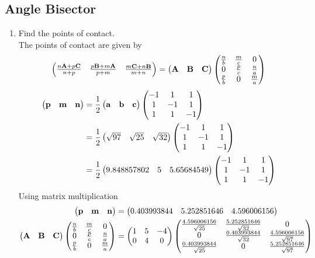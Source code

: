 \documentclass[11pt]{book}
\begin{document}
\subsection{Angle Bisector}


\begin{enumerate}[label=\thesubsection.\arabic*.,ref=\thesubsection.\theenumi]
\item Find the points of contact. \\ 
\solution The points of contact are given by 
\begin{align}
\begin{pmatrix}			\frac{n\mathbf{A}+p\mathbf{C}}{n+p}
&
\frac{p\mathbf{B}+m\mathbf{A}}{p+m}
&
\frac{m\mathbf{C}+n\mathbf{B}}{m+n}
\end{pmatrix}
= 	\begin{pmatrix}\mathbf{A} & \mathbf{B} &\mathbf{C}\end{pmatrix}\begin{pmatrix}\frac{n}{b} & \frac{m}{c} & 0\\0 & \frac{p}{c} & \frac{n}{a} \\\frac{p}{b} & 0 & \frac{m}{a}\end{pmatrix}
\end{align}
\begin{align}
    \begin{pmatrix}\mathbf{p} & \mathbf{m} & \mathbf{n} \end{pmatrix} &=\frac{1}{2} \begin{pmatrix}\mathbf{a} & \mathbf{b} & \mathbf{c}\end{pmatrix} \begin{pmatrix} -1 & 1 & 1 \\1 & -1 & 1 \\1 & 1 & -1 \end{pmatrix} \\
   &= \frac{1}{2}\begin{pmatrix} \sqrt{97}&  \sqrt{25} & \sqrt{32} \end{pmatrix}\begin{pmatrix} -1 & 1 & 1 \\1 & -1 & 1 \\1 & 1 & -1 \end{pmatrix}  \\
   &= \frac{1}{2}\begin{pmatrix} 9.848857802&  5 & 5.65684549 \end{pmatrix}\begin{pmatrix} -1 & 1 & 1 \\1 & -1 & 1 \\1 & 1 & -1 \end{pmatrix}
\end{align}
Using matrix multiplication 
\begin{align}
        \begin{pmatrix}\mathbf{p} & \mathbf{m} & \mathbf{n} \end{pmatrix} &= \begin{pmatrix}  0.403993844& 5.252851646 & 4.596006156 \end{pmatrix}   \\
\begin{pmatrix}\mathbf{A} & \mathbf{B} &\mathbf{C}\end{pmatrix}\begin{pmatrix}\frac{n}{b} & \frac{m}{c} & 0\\0 & \frac{p}{c} & \frac{n}{a} \\\frac{p}{b} & 0 & \frac{m}{a}\end{pmatrix} 
  &= \begin{pmatrix}1 & 5 & -4 \\ 0 & 4 & 0\end{pmatrix} \begin{pmatrix}\frac{4.596006156}{\sqrt{25}} & \frac{5.252851646}{\sqrt{32}} & 0\\0 & \frac{0.403993844}{\sqrt{32}} & \frac{4.596006156}{\sqrt{97}} \\\frac{0.403993844}{\sqrt{25}} & 0 & \frac{5.252851646}{\sqrt{97}}\end{pmatrix}
\end{align}

\end{enumerate}
\end{document}
